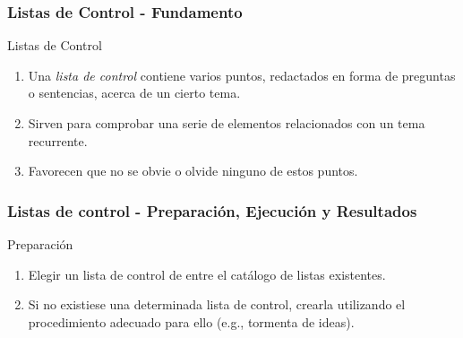 ﻿\documentclass[handout,a4paper,slidestop,xcolor=pst,dvips,blue]{beamer}
\begin{document}
\begin{frame}[t]
    \frametitle{Listas de Control - Fundamento}
    \begin{block}{Listas de Control}
        \begin{enumerate}[<+->]
            \item Una \emph{lista de control} contiene varios puntos, redactados en forma de preguntas o sentencias, acerca de un cierto tema.
            \item Sirven para comprobar una serie de elementos relacionados con un tema recurrente.
            \item Favorecen que no se obvie o olvide ninguno de estos puntos.
        \end{enumerate}
    \end{block}
\end{frame}

\begin{frame}[c]
    \frametitle{Listas de control - Preparación, Ejecución y Resultados}
    \begin{block}{Preparación}
    \begin{enumerate}[<+->]
        \item Elegir un lista de control de entre el catálogo de listas existentes.
        \item Si no existiese una determinada lista de control, crearla utilizando el procedimiento adecuado para ello (e.g., tormenta de ideas).
    \end{enumerate}
    \end{block}
\end{frame}
\end{document}
